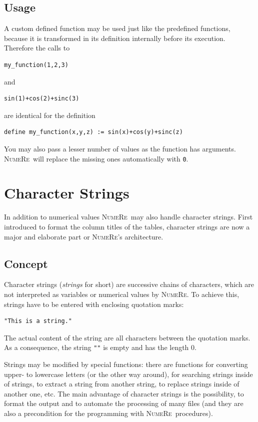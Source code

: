 \documentclass[DIV=14,headsepline,footsepline]{scrbook}
\newcommand{\NR}{\textsc{Nu\-me\-Re}}
\begin{document}
			\section{Usage}
				A custom defined function may be used just like the predefined functions, because it is transformed in its definition internally before its execution. Therefore the calls to
				\begin{lstlisting}
my_function(1,2,3)
				\end{lstlisting}
				and 
				\begin{lstlisting}
sin(1)+cos(2)+sinc(3)
				\end{lstlisting}
				are identical for the definition
				\begin{lstlisting}
define my_function(x,y,z) := sin(x)+cos(y)+sinc(z)
				\end{lstlisting}
				You may also pass a lesser number of values as the function has arguments. \NR\ will replace the missing ones automatically with \lstinline+0+.
		\chapter{Character Strings}
			In addition to numerical values \NR\ may also handle character strings. First introduced to format the column titles of the tables, character strings are now a major and elaborate part or \NR's architecture.
			\section{Concept}
				Character strings (\emph{strings} for short) are successive chains of characters, which are not interpreted as variables or numerical values by \NR. To achieve this, strings have to be entered with enclosing quotation marks:
				\begin{lstlisting}
"This is a string."
				\end{lstlisting}
				The actual content of the string are all characters between the quotation marks. As a consequence, the string \lstinline+""+ is empty and has the length 0.
				
				Strings may be modified by special functions: there are functions for converting upper- to lowercase letters (or the other way around), for searching strings inside of strings, to extract a string from another string, to replace strings inside of another one, etc. The main advantage of character strings is the possibility, to format the output and to automate the processing of many files (and they are also a precondition for the programming with \NR\ procedures).
				
\end{document}

